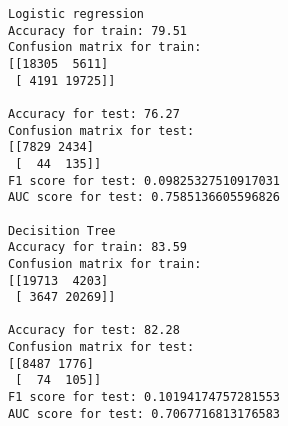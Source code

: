 \documentclass[11pt]{article}
\begin{document}
    \begin{Verbatim}[commandchars=\\\{\}]
Logistic regression
Accuracy for train: 79.51
Confusion matrix for train:
[[18305  5611]
 [ 4191 19725]]

Accuracy for test: 76.27
Confusion matrix for test:
[[7829 2434]
 [  44  135]]
F1 score for test: 0.09825327510917031
AUC score for test: 0.7585136605596826

Decisition Tree
Accuracy for train: 83.59
Confusion matrix for train:
[[19713  4203]
 [ 3647 20269]]

Accuracy for test: 82.28
Confusion matrix for test:
[[8487 1776]
 [  74  105]]
F1 score for test: 0.10194174757281553
AUC score for test: 0.7067716813176583


    \end{Verbatim}
\end{document}
